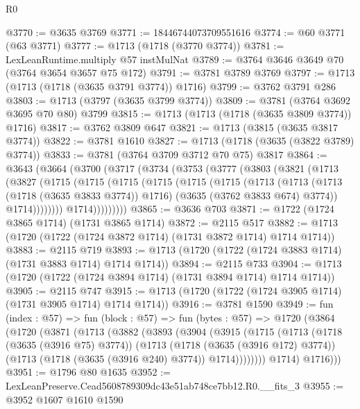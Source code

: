 \begin{lexlean}{R0}
\begin{coremodule}
@3770 := @3635 @3769
@3771 := 18446744073709551616
@3774 := @60 @3771 (@63 @3771)
@3777 := @1713 (@1718 (@3770 @3774))
@3781 := LexLeanRuntime.multiply @57 instMulNat
@3789 := @3764 @3646 @3649 @70 (@3764 @3654 @3657 @75 @172)
@3791 := @3781 @3789 @3769
@3797 := @1713 (@1713 (@1718 (@3635 @3791 @3774)) @1716)
@3799 := @3762 @3791 @286
@3803 := @1713 (@3797 (@3635 @3799 @3774))
@3809 := @3781 (@3764 @3692 @3695 @70 @80) @3799
@3815 := @1713 (@1713 (@1718 (@3635 @3809 @3774)) @1716)
@3817 := @3762 @3809 @647
@3821 := @1713 (@3815 (@3635 @3817 @3774))
@3822 := @3781 @1610
@3827 := @1713 (@1718 (@3635 (@3822 @3789) @3774))
@3833 := @3781 (@3764 @3709 @3712 @70 @75) @3817
@3864 := @3643
    (@3664
      (@3700
        (@3717
          (@3734
            (@3753
              (@3777
                (@3803
                  (@3821
                    (@1713
                      (@3827
                        (@1715
                          (@1715
                            (@1715
                              (@1715
                                (@1715
                                  (@1715
                                    (@1713
                                      (@1713
                                        (@1713 (@1718 (@3635 @3833 @3774)) @1716)
                                        (@3635 (@3762 @3833 @674) @3774))
                                      @1714))))))))
                      @1714)))))))))
@3865 := @3636 @703
@3871 := @1722 (@1724 @3865 @1714) (@1731 @3865 @1714)
@3872 := @2115 @517
@3882 := @1713 (@1720 (@1722 (@1724 @3872 @1714) (@1731 @3872 @1714) @1714 @1714))
@3883 := @2115 @719
@3893 := @1713 (@1720 (@1722 (@1724 @3883 @1714) (@1731 @3883 @1714) @1714 @1714))
@3894 := @2115 @733
@3904 := @1713 (@1720 (@1722 (@1724 @3894 @1714) (@1731 @3894 @1714) @1714 @1714))
@3905 := @2115 @747
@3915 := @1713 (@1720 (@1722 (@1724 @3905 @1714) (@1731 @3905 @1714) @1714 @1714))
@3916 := @3781 @1590
@3949 := fun (index : @57) =>
  fun (block : @57) =>
  fun (bytes : @57) =>
  @1720
    (@3864
      (@1720
        (@3871
          (@1713
            (@3882
              (@3893
                (@3904
                  (@3915
                    (@1715
                      (@1713
                        (@1718 (@3635 (@3916 @75) @3774))
                        (@1713
                          (@1718 (@3635 (@3916 @172) @3774))
                          (@1713 (@1718 (@3635 (@3916 @240) @3774)) @1714))))))))
            @1714)
          @1716)))
@3951 := @1796 @80 @1635
@3952 := LexLeanPreserve.Cead5608789309dc43e51ab748ce7bb12.R0.__fits_3
@3955 := @3952 @1607 @1610 @1590

\end{coremodule}
\end{lexlean}
